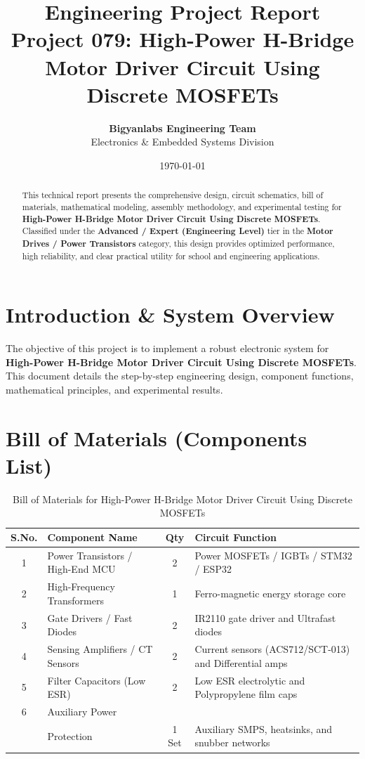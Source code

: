 \documentclass[11pt,a4paper]{article}
\title{\textbf{\Huge Engineering Project Report}\\[0.5em] \Large Project 079: High-Power H-Bridge Motor Driver Circuit Using Discrete MOSFETs}
\author{\textbf{Bigyanlabs Engineering Team}\\ Electronics \& Embedded Systems Division}
\date{\today}
\begin{document}
\maketitle
\thispagestyle{empty}

\begin{abstract}
This technical report presents the comprehensive design, circuit schematics, bill of materials, mathematical modeling, assembly methodology, and experimental testing for \textbf{High-Power H-Bridge Motor Driver Circuit Using Discrete MOSFETs}. Classified under the \textbf{Advanced / Expert (Engineering Level)} tier in the \textbf{Motor Drives / Power Transistors} category, this design provides optimized performance, high reliability, and clear practical utility for school and engineering applications.
\end{abstract}

\newpage
\tableofcontents
\newpage

\section{Introduction \& System Overview}
The objective of this project is to implement a robust electronic system for \textbf{High-Power H-Bridge Motor Driver Circuit Using Discrete MOSFETs}. This document details the step-by-step engineering design, component functions, mathematical principles, and experimental results.

\section{Bill of Materials (Components List)}
\begin{table}[h!]
\centering
\caption{Bill of Materials for High-Power H-Bridge Motor Driver Circuit Using Discrete MOSFETs}
\vspace{0.5em}
\begin{tabular}{clcp{7cm}}
\toprule
\textbf{S.No.} & \textbf{Component Name} & \textbf{Qty} & \textbf{Circuit Function} \\
\midrule
1 & Power Transistors / High-End MCU & 2 & Power MOSFETs / IGBTs / STM32 / ESP32 \\
2 & High-Frequency Transformers & 1 & Ferro-magnetic energy storage core \\
3 & Gate Drivers / Fast Diodes & 2 & IR2110 gate driver and Ultrafast diodes \\
4 & Sensing Amplifiers / CT Sensors & 2 & Current sensors (ACS712/SCT-013) and Differential amps \\
5 & Filter Capacitors (Low ESR) & 2 & Low ESR electrolytic and Polypropylene film caps \\
6 & Auxiliary Power \\& Protection & 1 Set & Auxiliary SMPS, heatsinks, and snubber networks \\
\bottomrule
\end{tabular}
\end{table}
\end{document}
